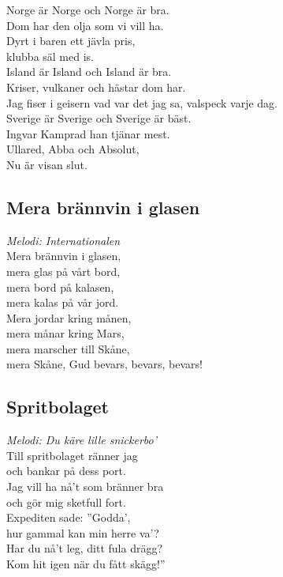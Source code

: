 \documentclass[a5paper]{article}
\begin{document}
\noindent 
Norge är Norge och Norge är bra. \\
Dom har den olja som vi vill ha. \\
Dyrt i baren ett jävla pris, \\
klubba säl med is. \\

\noindent 
Island är Island och Island är bra. \\
Kriser, vulkaner och hästar dom har. \\
Jag fiser i geisern vad var det jag sa, valspeck varje dag. \\

\noindent 
Sverige är Sverige och Sverige är bäst. \\
Ingvar Kamprad han tjänar mest. \\
Ullared, Abba och Absolut, \\
Nu är visan slut. \\


\subsection{Mera brännvin i glasen}
\textit{Melodi: Internationalen} \\

\noindent
Mera brännvin i glasen, \\
mera glas på vårt bord, \\
mera bord på kalasen, \\
mera kalas på vår jord. \\
 
\noindent
Mera jordar kring månen, \\
mera månar kring Mars, \\
mera marscher till Skåne, \\
mera Skåne, Gud bevars, bevars, bevars! \\


\newpage
\subsection{Spritbolaget}

\textit{Melodi: Du käre lille snickerbo’} \\

\noindent
Till spritbolaget ränner jag \\
och bankar på dess port. \\
Jag vill ha nå’t som bränner bra \\
och gör mig sketfull fort. \\
Expediten sade: ”Godda’, \\
hur gammal kan min herre va’? \\
Har du nå’t leg, ditt fula drägg? \\
Kom hit igen när du fått skägg!” \\
\end{document}
